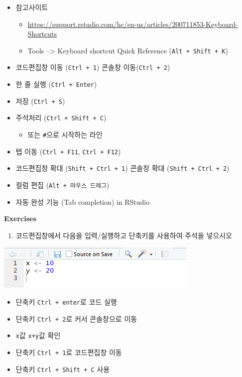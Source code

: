 \documentclass[
]{book}
\providecommand{\tightlist}{%
  \setlength{\itemsep}{0pt}\setlength{\parskip}{0pt}}
\begin{document}
\begin{itemize}
\tightlist
\item
  참고사이트

  \begin{itemize}
  \tightlist
  \item
    \url{https://support.rstudio.com/hc/en-us/articles/200711853-Keyboard-Shortcuts}
  \item
    Tools --\textgreater{} Keyboard shortcut Quick Reference (\texttt{Alt\ +\ Shift\ +\ K})
  \end{itemize}
\item
  코드편집창 이동 (\texttt{Ctrl\ +\ 1}) 콘솔창 이동(\texttt{Ctrl\ +\ 2})
\item
  한 줄 실행 (\texttt{Ctrl\ +\ Enter})
\item
  저장 (\texttt{Ctrl\ +\ S})
\item
  주석처리 (\texttt{Ctrl\ +\ Shift\ +\ C})

  \begin{itemize}
  \tightlist
  \item
    또는 \texttt{\#}으로 시작하는 라인
  \end{itemize}
\item
  텝 이동 (\texttt{Ctrl\ +\ F11}, \texttt{Ctrl\ +\ F12})
\item
  코드편집창 확대 (\texttt{Shift\ +\ Ctrl\ +\ 1}) 콘솔창 확대 (\texttt{Shift\ +\ Ctrl\ +\ 2})
\item
  컬럼 편집 (\texttt{Alt\ +\ 마우스\ 드레그})
\item
  자동 완성 기능 (Tab completion) in RStudio
\end{itemize}

\textbf{Exercises}

\begin{enumerate}
\def\labelenumi{\arabic{enumi}.}
\tightlist
\item
  코드편집창에서 다음을 입력/실행하고 단축키를 사용하여 주석을 넣으시오
\end{enumerate}

\includegraphics{images/01/01-14.PNG}

\begin{itemize}
\tightlist
\item
  단축키 \texttt{Ctrl\ +\ enter}로 코드 실행
\item
  단축키 \texttt{Ctrl\ +\ 2}로 커서 콘솔창으로 이동
\item
  \texttt{x}값 \texttt{x+y}값 확인
\item
  단축키 \texttt{Ctrl\ +\ 1}로 코드편집창 이동
\item
  단축키 \texttt{Ctrl\ +\ Shift\ +\ C} 사용
\end{itemize}
\end{document}
